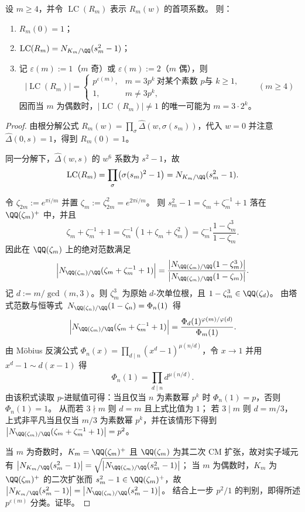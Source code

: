 \begin{proposition}[首项系数的范数公式与唯一素数异常]\label{prop:sync-cyclotomic-elimination-leading-coefficient-norm}
设 \(m\ge 4\)，并令 \(\operatorname{LC}(R_m)\) 表示 \(R_m(w)\) 的首项系数。
则：
\begin{enumerate}
  \item \(R_m(0)=1\)；
  \item \(\operatorname{LC}(R_m)=N_{K_m/\QQ}(s_m^2-1)\)；
  \item 记 \(\varepsilon(m):=1\)（\(m\) 奇）或 \(\varepsilon(m):=2\)（\(m\) 偶），则
  \[
  \boxed{\;
  \bigl|\operatorname{LC}(R_m)\bigr|=
  \begin{cases}
  p^{\varepsilon(m)},& m=3p^k\ \text{对某个素数 }p\text{与 }k\ge 1,\\
  1,& m\neq 3p^k,
  \end{cases}\qquad (m\ge 4)\;}
  \]
  因而当 \(m\) 为偶数时，\(\bigl|\operatorname{LC}(R_m)\bigr|\neq 1\) 的唯一可能为 \(m=3\cdot 2^k\)。
\end{enumerate}
\end{proposition}
\begin{proof}
由根分解公式 \(R_m(w)=\prod_{\sigma}\widehat\Delta(w,\sigma(s_m))\)，代入 \(w=0\) 并注意 \(\widehat\Delta(0,s)=1\)，得到 \(R_m(0)=1\)。
\par
同一分解下，\(\widehat\Delta(w,s)\) 的 \(w^6\) 系数为 \(s^2-1\)，故
\[
\operatorname{LC}(R_m)=\prod_{\sigma}\bigl(\sigma(s_m)^2-1\bigr)=N_{K_m/\QQ}(s_m^2-1).
\]
\par
令 \(\zeta_{2m}:=e^{\pi i/m}\) 并置 \(\zeta_m:=\zeta_{2m}^2=e^{2\pi i/m}\)。
则
\(
s_m^2-1=\zeta_m+\zeta_m^{-1}+1
\)
落在 \(\QQ(\zeta_m)^+\) 中，并且
\[
\zeta_m+\zeta_m^{-1}+1=\zeta_m^{-1}(1+\zeta_m+\zeta_m^2)
=\zeta_m^{-1}\frac{1-\zeta_m^3}{1-\zeta_m}.
\]
因此在 \(\QQ(\zeta_m)\) 上的绝对范数满足
\[
\Bigl|N_{\QQ(\zeta_m)/\QQ}(\zeta_m+\zeta_m^{-1}+1)\Bigr|
=\frac{\bigl|N_{\QQ(\zeta_m)/\QQ}(1-\zeta_m^3)\bigr|}{\bigl|N_{\QQ(\zeta_m)/\QQ}(1-\zeta_m)\bigr|}.
\]
记 \(d:=m/\gcd(m,3)\)。则 \(\zeta_m^3\) 为原始 \(d\)-次单位根，且 \(1-\zeta_m^3\in\QQ(\zeta_d)\)。
由塔式范数与恒等式 \(\,N_{\QQ(\zeta_n)/\QQ}(1-\zeta_n)=\Phi_n(1)\,\) 得
\[
\Bigl|N_{\QQ(\zeta_m)/\QQ}(\zeta_m+\zeta_m^{-1}+1)\Bigr|
=\frac{\Phi_d(1)^{\varphi(m)/\varphi(d)}}{\Phi_m(1)}.
\]
由 Möbius 反演公式 \(\Phi_n(x)=\prod_{d\mid n}(x^d-1)^{\mu(n/d)}\)，令 \(x\to 1\) 并用 \(x^d-1\sim d(x-1)\) 得
\[
\Phi_n(1)=\prod_{d\mid n} d^{\mu(n/d)}.
\]
由该积式读取 \(p\)-进赋值可得：当且仅当 \(n\) 为素数幂 \(p^k\) 时 \(\Phi_n(1)=p\)，否则 \(\Phi_n(1)=1\)。
从而若 \(3\nmid m\) 则 \(d=m\) 且上式比值为 \(1\)；
若 \(3\mid m\) 则 \(d=m/3\)，上式非平凡当且仅当 \(m/3\) 为素数幂 \(p^k\)，并在该情形下得到
\(
\bigl|N_{\QQ(\zeta_m)/\QQ}(\zeta_m+\zeta_m^{-1}+1)\bigr|=p^2
\)。
\par
当 \(m\) 为奇数时，\(K_m=\QQ(\zeta_m)^+\) 且 \(\QQ(\zeta_m)\) 为其二次 CM 扩张，故对实子域元有
\(
\bigl|N_{K_m/\QQ}(s_m^2-1)\bigr|
=\sqrt{\bigl|N_{\QQ(\zeta_m)/\QQ}(s_m^2-1)\bigr|}
\)；
当 \(m\) 为偶数时，\(K_m\) 为 \(\QQ(\zeta_m)^+\) 的二次扩张而 \(s_m^2-1\in\QQ(\zeta_m)^+\)，故
\(
\bigl|N_{K_m/\QQ}(s_m^2-1)\bigr|
=\bigl|N_{\QQ(\zeta_m)/\QQ}(s_m^2-1)\bigr|
\)。
结合上一步 \(p^2/1\) 的判别，即得所述 \(p^{\varepsilon(m)}\) 分类。证毕。
\end{proof}
